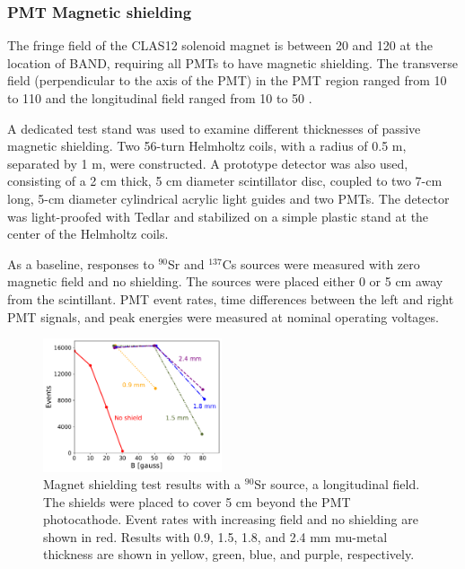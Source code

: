 \documentclass[review,number,sort&compress]{elsarticle}
\begin{document}
\subsubsection{PMT Magnetic shielding}


The fringe field of the CLAS12 solenoid magnet
\cite{Fair:2020yfx} is between 20 and 120 \si{\gauss} at the location of
BAND, requiring all PMTs to have magnetic shielding. The transverse
field (perpendicular to the axis of the PMT) in the PMT region ranged from 10 to
  110 \si{\gauss} and the longitudinal field ranged from 10 to 50 \si{\gauss}.

  A dedicated test stand was used to examine different thicknesses of
  passive magnetic shielding. Two 56-turn Helmholtz
  coils, with a radius of 0.5 \si{\meter}, separated by 1 \si{\meter}, were 
  constructed. A prototype detector was also used, consisting of a 2 \si{\centi\meter} thick, 5
  \si{\centi\meter} diameter scintillator disc, coupled to two
  7-\si{\centi\meter} long, 5-\si{\centi\meter} diameter cylindrical
  acrylic light guides and two PMTs. The detector was
  light-proofed with Tedlar\textregistered{} and stabilized on a simple plastic stand
  at the center of the Helmholtz coils.

  As a baseline, responses to $^{90}$Sr and $^{137}$Cs sources were measured with zero magnetic field and no shielding. The sources were placed either 0 or 5 \si{\centi\meter} away from the scintillant. PMT event rates, time differences between the left and right PMT signals, and peak energies were measured at nominal operating voltages.
\begin{figure}[tb]
	\centering
			\includegraphics[width=0.47\textwidth]{fig9-shields.pdf}
	\caption{Magnet shielding test results with a $^{90}$Sr source, a longitudinal field. The shields were placed to cover 5 \si{\centi\meter} beyond the PMT photocathode. Event rates with increasing field and no shielding are shown in red. Results with 0.9, 1.5, 1.8, and 2.4 \si{\milli\meter} mu-metal thickness are shown in yellow, green, blue, and purple, respectively.}
	\label{fig:shielding_results}
\end{figure}  
  
\end{document}
